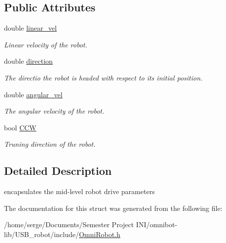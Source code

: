 \subsection*{Public Attributes}
\begin{DoxyCompactItemize}
\item 
\hypertarget{structrobot_drive_state_add7fd9cb9f3093995d3179e0d23f89e1}{}double \hyperlink{structrobot_drive_state_add7fd9cb9f3093995d3179e0d23f89e1}{linear\+\_\+vel}\label{structrobot_drive_state_add7fd9cb9f3093995d3179e0d23f89e1}

\begin{DoxyCompactList}\small\item\em Linear velocity of the robot. \end{DoxyCompactList}\item 
\hypertarget{structrobot_drive_state_a117f5c632459517d549ee5e9ecaaa008}{}double \hyperlink{structrobot_drive_state_a117f5c632459517d549ee5e9ecaaa008}{direction}\label{structrobot_drive_state_a117f5c632459517d549ee5e9ecaaa008}

\begin{DoxyCompactList}\small\item\em The directio the robot is headed with respect to its initial position. \end{DoxyCompactList}\item 
\hypertarget{structrobot_drive_state_aaddce997ec0bc7495e60cf577b956af7}{}double \hyperlink{structrobot_drive_state_aaddce997ec0bc7495e60cf577b956af7}{angular\+\_\+vel}\label{structrobot_drive_state_aaddce997ec0bc7495e60cf577b956af7}

\begin{DoxyCompactList}\small\item\em The angular velocity of the robot. \end{DoxyCompactList}\item 
\hypertarget{structrobot_drive_state_a0e604f06f3708dacbfd81105fa135053}{}bool \hyperlink{structrobot_drive_state_a0e604f06f3708dacbfd81105fa135053}{C\+C\+W}\label{structrobot_drive_state_a0e604f06f3708dacbfd81105fa135053}

\begin{DoxyCompactList}\small\item\em Truning direction of the robot. \end{DoxyCompactList}\end{DoxyCompactItemize}


\subsection{Detailed Description}
encapsulates the mid-\/level robot drive parameters 

The documentation for this struct was generated from the following file\+:\begin{DoxyCompactItemize}
\item 
/home/serge/\+Documents/\+Semester Project I\+N\+I/omnibot-\/lib/\+U\+S\+B\+\_\+robot/include/\hyperlink{_omni_robot_8h}{Omni\+Robot.\+h}\end{DoxyCompactItemize}

